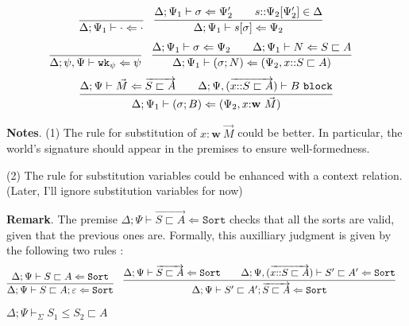 \documentclass[letterpaper, 11pt]{article}
\newcommand{\Lar}{\Leftarrow}
\newcommand{\Sort}{\texttt{Sort}}
\newcommand{\wk}{\texttt{wk}}
\newcommand{\block}{\texttt{block}}
\begin{document}
    \begin{align*}
      & \infer{\Delta; \Psi_1 \vdash \cdot \Lar \cdot}{} &
      & \infer{\Delta; \Psi_1 \vdash s[\sigma] \Lar \Psi_2}
        {
          \Delta; \Psi_1 \vdash \sigma \Lar \Psi_2'
          &&
          s{::}\Psi_2[\Psi_2'] \in \Delta
        }
    \end{align*}
    \begin{align*}
      & \infer{\Delta; \psi, \Psi \vdash \wk_\psi \Lar \psi}{} &
      & \infer{\Delta; \Psi_1 \vdash (\sigma; N) \Lar (\Psi_2, x{::}S \sqsubset A)}
        {
          \Delta; \Psi_1 \vdash \sigma \Lar \Psi_2
          &&
          \Delta; \Psi_1 \vdash N \Lar S \sqsubset A
        }
    \end{align*}
    \begin{align*}
      \infer{\Delta; \Psi_1 \vdash (\sigma; B) \Lar (\Psi_2, x{:} \textbf{w} \ \vec{M})}
            {
              \Delta; \Psi \vdash \vec{M} \Lar \overrightarrow{S \sqsubset A}
              &&
              \Delta; \Psi, (\overrightarrow{x{::}S \sqsubset A}) \vdash B \ \block %
            }
    \end{align*}

    \textbf{Notes}. (1) The rule for substitution of $x : \textbf{w} \ \vec{M}$ could be better.  In particular, the world's signature should appear
    in the premises to ensure well-formedness.

    (2) The rule for substitution variables could be enhanced with a context relation.  (Later, I'll ignore substitution variables for now)

    \textbf{Remark}.  The premise $\Delta; \Psi \vdash \overrightarrow{S \sqsubset A} \Lar \Sort$ checks that all the sorts are valid, given that 
    the previous ones are.  Formally, this auxilliary judgment is given by the following two rules :
    \begin{align*}
      & \infer{\Delta; \Psi \vdash S \sqsubset A ; \varepsilon \Lar \Sort}{ \Delta; \Psi \vdash S \sqsubset A \Lar \Sort} &
      & \infer{\Delta; \Psi \vdash S' \sqsubset A' ; \overrightarrow{S \sqsubset A} \Lar \Sort}
        {
          \Delta; \Psi \vdash \overrightarrow{S \sqsubset A} \Lar \Sort
          &&
          \Delta; \Psi, (\overrightarrow{x{::}S \sqsubset A}) \vdash S' \sqsubset A' \Lar \Sort
        }
    \end{align*}

    $\boxed{ \Delta; \Psi \vdash_\Sigma S_1 \leq S_2 \sqsubset A }$
    
\end{document}
